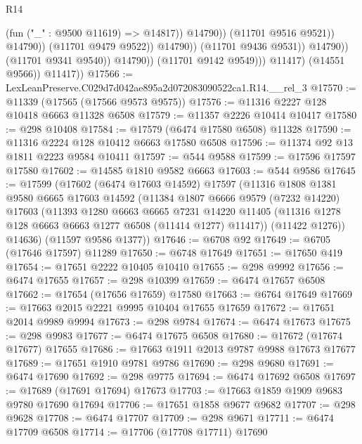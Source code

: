 \begin{lexlean}{R14}
\begin{coremodule}
                                              (fun ("_" : @9500 @11619) => @14817))
                                            @14790))
                                        (@11701 @9516 @9521))
                                      @14790))
                                  (@11701 @9479 @9522))
                                @14790))
                            (@11701 @9436 @9531))
                          @14790))
                      (@11701 @9341 @9540))
                    @14790))
                (@11701 @9142 @9549)))
            @11417)
          (@14551 @9566))
        @11417))
@17566 := LexLeanPreserve.C029d7d042ae895a2d072083090522ca1.R14.__rel_3
@17570 := @11339 (@17565 (@17566 @9573 @9575))
@17576 := @11316 @2227 @128 @10418 @6663 @11328 @6508
@17579 := @11357 @2226 @10414 @10417
@17580 := @298 @10408
@17584 := @17579 (@6474 @17580 @6508) @11328
@17590 := @11316 @2224 @128 @10412 @6663 @17580 @6508
@17596 := @11374 @92 @13 @1811 @2223 @9584 @10411
@17597 := @544 @9588
@17599 := @17596 @17597 @17580
@17602 := @14585 @1810 @9582 @6663
@17603 := @544 @9586
@17645 := @17599
    (@17602
      (@6474 @17603 @14592)
      @17597
      (@11316
        @1808
        @1381
        @9580
        @6665
        @17603
        @14592
        (@11384
          @1807
          @6666
          @9579
          (@7232 @14220)
          @17603
          (@11393
            @1280
            @6663
            @6665
            @7231
            @14220
            @11405
            (@11316 @1278 @128 @6663 @6663 @1277 @6508 (@11414 @1277) @11417))
          (@11422 @1276))
        @14636)
      (@11597 @9586 @1377))
@17646 := @6708 @92
@17649 := @6705 (@17646 @17597) @11289
@17650 := @6748 @17649
@17651 := @17650 @419
@17654 := @17651 @2222 @10405 @10410
@17655 := @298 @9992
@17656 := @6474 @17655
@17657 := @298 @10399
@17659 := @6474 @17657 @6508
@17662 := @17654 (@17656 @17659) @17580
@17663 := @6764 @17649
@17669 := @17663 @2015 @2221 @9995 @10404 @17655 @17659
@17672 := @17651 @2014 @9989 @9994
@17673 := @298 @9784
@17674 := @6474 @17673
@17675 := @298 @9983
@17677 := @6474 @17675 @6508
@17680 := @17672 (@17674 @17677) @17655
@17686 := @17663 @1911 @2013 @9787 @9988 @17673 @17677
@17689 := @17651 @1910 @9781 @9786
@17690 := @298 @9680
@17691 := @6474 @17690
@17692 := @298 @9775
@17694 := @6474 @17692 @6508
@17697 := @17689 (@17691 @17694) @17673
@17703 := @17663 @1859 @1909 @9683 @9780 @17690 @17694
@17706 := @17651 @1858 @9677 @9682
@17707 := @298 @9628
@17708 := @6474 @17707
@17709 := @298 @9671
@17711 := @6474 @17709 @6508
@17714 := @17706 (@17708 @17711) @17690

\end{coremodule}
\end{lexlean}
